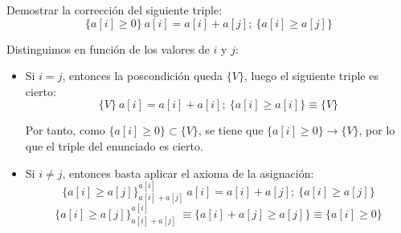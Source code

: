 \begin{ejercicio}
    Demostrar la corrección del siguiente triple:
    \begin{equation*}
        \{a[i]\geq 0\}\ a[i]=a[i]+a[j];\ \{a[i]\geq a[j]\}
    \end{equation*}

    Distinguimos en función de los valores de $i$ y $j$:
    \begin{itemize}
        \item Si $i=j$, entonces la poscondición queda $\{V\}$, luego el siguiente triple es cierto:
        \begin{equation*}
            \{V\}\ a[i]=a[i]+a[i];\ \{a[i]\geq a[i]\}\equiv \{V\}
        \end{equation*}

        Por tanto, como $\{a[i]\geq 0\}\subset \{V\}$, se tiene que $\{a[i]\geq 0\}\rightarrow \{V\}$, por lo que el triple del enunciado es cierto.
        \item Si $i\neq j$, entonces basta aplicar el axioma de la asignación:
        \begin{equation*}
            \{a[i]\geq a[j]\}_{a[i]+a[j]}^{a[i]}\ a[i]=a[i]+a[j];\ \{a[i]\geq a[j]\}
        \end{equation*}
        \begin{equation*}
            \{a[i]\geq a[j]\}_{a[i]+a[j]}^{a[i]}\ \equiv \{a[i]+a[j]\geq a[j]\} \equiv \{a[i] \geq 0\}
        \end{equation*}
    \end{itemize}
\end{ejercicio}


